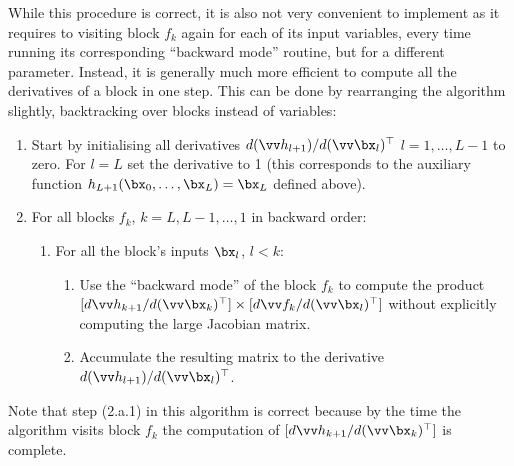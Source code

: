 While this procedure is correct, it is also not very convenient to implement as it requires to visiting block $f_k$ again for each of its input variables, every time running its corresponding ``backward mode'' routine, but for a different parameter. Instead, it is generally much more efficient to compute all the derivatives of a block in one step. This can be done by rearranging the algorithm slightly, backtracking over blocks instead of variables:
\begin{enumerate}
\item Start by initialising all derivatives ${d (\vv h_{l+1})}/{d(\vv \bx_l)^\top}$ $l=1,\dots,L-1$ to zero. For $l=L$ set the derivative to 1 (this corresponds to the auxiliary function $h_{L+1}(\bx_0,\dots,\bx_L) = \bx_L$ defined above).
\item For all blocks $f_k$, $k=L,L-1,\dots,1$ in backward order:
\begin{enumerate}
	\item For all the block's inputs $\bx_l$, $l < k$:
	\begin{enumerate}
	\item Use the ``backward mode'' of the block $f_k$ to compute the product $[{d\vv h_{k+1}}/{d(\vv \bx_k)^\top}]\times[
{d\vv f_k}/{d(\vv \bx_l)^\top}]$  without explicitly computing the large Jacobian matrix. 
	\item Accumulate the resulting matrix to the derivative $d(\vv h_{l+1} )/d(\vv \bx_{l})^\top$.
	\end{enumerate}
	\end{enumerate}
\end{enumerate}
Note that step (2.a.1) in this algorithm is correct because by the time the algorithm visits block $f_k$ the computation of $[{d\vv h_{k+1}}/{d(\vv \bx_k)^\top}]$ is complete. 
